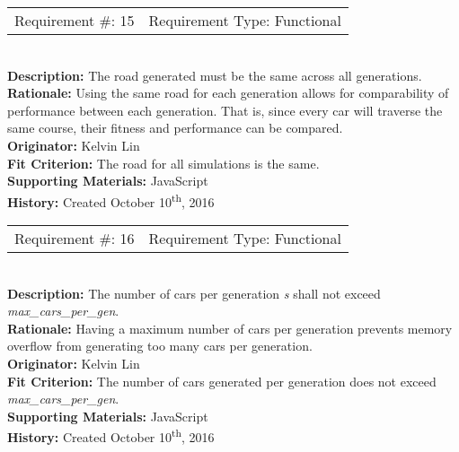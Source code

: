 \documentclass[12pt, titlepage]{article}
\begin{document}
\begin{reqbox}
%
\begin{tabular}{cc}
Requirement \#: 15 & Requirement Type: Functional \\
\end{tabular} \\
%
\textbf{Description:} The road generated must be the same across all 
generations. \\
\textbf{Rationale:} Using the same road for each generation allows for 
comparability of performance between each generation. That is, since every car 
will traverse the same course, their fitness and performance can be compared. \\
\textbf{Originator:} Kelvin Lin\\
\textbf{Fit Criterion:} The road for all simulations is the same. \\
%  
\textbf{Supporting Materials:} JavaScript \\
\textbf{History:} Created October 10\textsuperscript{th}, 2016
%
\end{reqbox}

\begin{reqbox}
%
\begin{tabular}{cc}
Requirement \#: 16 & Requirement Type: Functional \\
\end{tabular} \\
%
\textbf{Description:} The number of cars per generation \textit{s} shall not 
exceed \textit{max\_cars\_per\_gen}. \\
\textbf{Rationale:} Having a maximum number of cars per generation prevents 
memory overflow from generating too many cars per generation.\\
\textbf{Originator:} Kelvin Lin\\
\textbf{Fit Criterion:} The number of cars generated per generation does not 
exceed \textit{max\_cars\_per\_gen}.\\
%  
\textbf{Supporting Materials:} JavaScript \\
\textbf{History:} Created October 10\textsuperscript{th}, 2016
%
\end{reqbox}

\newpage
\end{document}
